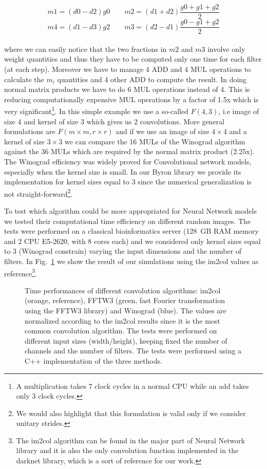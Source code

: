 \documentclass{standalone}
\begin{document}
$$
m1 = (d0 - d2)g0\quad\quad m2 = (d1 + d2)\frac{g0 + g1 + g2}{2}
$$
$$
m4 = (d1 - d3)g2\quad\quad m3 = (d2 - d1)\frac{g0 - g1 + g2}{2}
$$
\\
where we can easily notice that the two fractions in $m2$ and $m3$ involve only weight quantities and thus they have to be computed only one time for each filter (at each step).
Moreover we have to manage 4 \textsf{ADD} and 4 \textsf{MUL} operations to calculate the $m_i$ quantities and 4 other ADD to compute the result.
In doing normal matrix products we have to do 6 \textsf{MUL} operations instead of 4.
This is reducing computationally expensive \textsf{MUL} operations by a factor of 1.5x which is very significant\footnote{
  A multiplication takes 7 clock cycles in a normal CPU while an add takes only 3 clock cycles.
}.
In this simple example we use a so-called $F(4, 3)$, i.e image of size 4 and kernel of size 3 which gives us 2 convolutions.
More general formulations are $F(m\times m, r \times r)$ and if we use an image of size $4\times4$ and a kernel of size $3\times3$ we can compare the 16 \textsf{MUL}s of the \textsf{Winograd} algorithm against the 36 \textsf{MUL}s which are required by the normal matrix product (2.25x).
The \textsf{Winograd} efficiency was widely proved for Convolutional network models, especially when the kernel size is small.
In our \textsf{Byron} library we provide its implementation for kernel sizes equal to 3 since the numerical generalization is not straight-forward\footnote{
  We would also highlight that this formulation is valid only if we consider unitary strides.
}.

To test which algorithm could be more appropriated for Neural Network models we tested their computational time efficiency on different random images.
The tests were performed on a classical bioinformatics server (128~GB RAM memory and 2 CPU E5-2620, with 8 cores each) and we considered only kernel sizes equal to 3 (\textsf{Winograd} constrain) varying the input dimensions and the number of filters.
In Fig.~\ref{fig:winograd_timing} we show the result of our simulations using the \textsf{im2col} values as reference\footnote{
  The \textsf{im2col} algorithm can be found in the major part of Neural Network library and it is also the only convolution function implemented in the \textsf{darknet} library, which is a sort of reference for our work.
}.

\begin{figure}[htbp]
\centering
\def\svgwidth{0.8\textwidth}

\caption{Time performances of different convolution algorithms: \textsf{im2col} (orange, reference), \textsf{FFTW3} (green, fast Fourier transformation using the \textsf{FFTW3} library) and \textsf{Winograd} (blue).
The values are normalized according to the \textsf{im2col} results since it is the most common convolution algorithm.
The tests were performed on different input sizes (width/height), keeping fixed the number of channels and the number of filters.
The tests were performed using a \textsf{C++} implementation of the three methods.
}
\label{fig:winograd_timing}
\end{figure}
\end{document}
